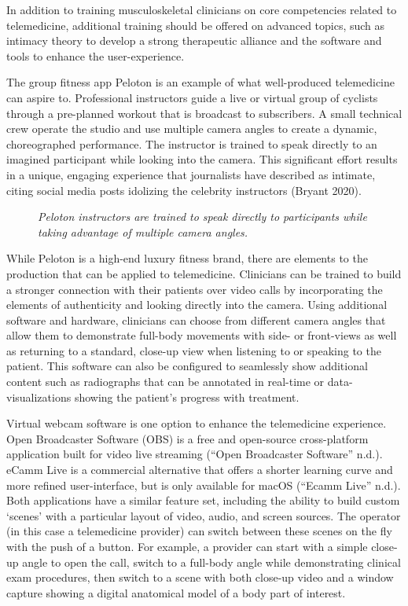 \documentclass[
  letterpaper,
]{article}
\makeatletter
\newcommand*\pandocbounded[1]{%
  \sbox\pandoc@box{#1}%
  \Gscale@div\@tempa{\textheight}{\dimexpr\ht\pandoc@box+\dp\pandoc@box\relax}%
  \Gscale@div\@tempb{\linewidth}{\wd\pandoc@box}%
  \ifdim\@tempb\p@<\@tempa\p@\let\@tempa\@tempb\fi%
  \ifdim\@tempa\p@<\p@\scalebox{\@tempa}{\usebox\pandoc@box}%
  \else\usebox{\pandoc@box}%
  \fi%
}
\makeatother
\begin{document}
In addition to training musculoskeletal clinicians on core competencies
related to telemedicine, additional training should be offered on
advanced topics, such as intimacy theory to develop a strong therapeutic
alliance and the software and tools to enhance the user-experience.

The group fitness app Peloton is an example of what well-produced
telemedicine can aspire to. Professional instructors guide a live or
virtual group of cyclists through a pre-planned workout that is
broadcast to subscribers. A small technical crew operate the studio and
use multiple camera angles to create a dynamic, choreographed
performance. The instructor is trained to speak directly to an imagined
participant while looking into the camera. This significant effort
results in a unique, engaging experience that journalists have described
as intimate, citing social media posts idolizing the celebrity
instructors (Bryant 2020).

\begin{figure}[H]

{\centering \pandocbounded{\texttt{[image: PelotonWideRightShot.png]}}

}

\caption{\emph{Peloton instructors are trained to speak directly to
participants while taking advantage of multiple camera angles.}}

\end{figure}%

While Peloton is a high-end luxury fitness brand, there are elements to
the production that can be applied to telemedicine. Clinicians can be
trained to build a stronger connection with their patients over video
calls by incorporating the elements of authenticity and looking directly
into the camera. Using additional software and hardware, clinicians can
choose from different camera angles that allow them to demonstrate
full-body movements with side- or front-views as well as returning to a
standard, close-up view when listening to or speaking to the patient.
This software can also be configured to seamlessly show additional
content such as radiographs that can be annotated in real-time or
data-visualizations showing the patient's progress with treatment.

Virtual webcam software is one option to enhance the telemedicine
experience. Open Broadcaster Software (OBS) is a free and open-source
cross-platform application built for video live streaming ({``Open
{Broadcaster Software}''} n.d.). eCamm Live is a commercial alternative
that offers a shorter learning curve and more refined user-interface,
but is only available for macOS ({``Ecamm {Live}''} n.d.). Both
applications have a similar feature set, including the ability to build
custom `scenes' with a particular layout of video, audio, and screen
sources. The operator (in this case a telemedicine provider) can switch
between these scenes on the fly with the push of a button. For example,
a provider can start with a simple close-up angle to open the call,
switch to a full-body angle while demonstrating clinical exam
procedures, then switch to a scene with both close-up video and a window
capture showing a digital anatomical model of a body part of interest.
\end{document}
